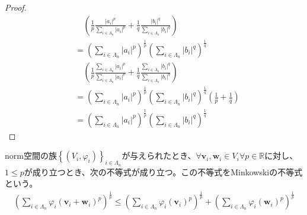 \documentclass[dvipdfmx]{jsarticle}
\begin{document}
\begin{proof}
\begin{align*}
&\quad \left( \frac{1}{p}\frac{\left| a_{i} \right|^{p}}{\sum_{i \in \varLambda_{n}} \left| a_{i} \right|^{p}} + \frac{1}{q}\frac{\left| b_{i} \right|^{q}}{\sum_{i \in \varLambda_{n}} \left| b_{i} \right|^{q}} \right)\\
&= \left( \sum_{i \in \varLambda_{n}} \left| a_{i} \right|^{p} \right)^{\frac{1}{p}}\left( \sum_{i \in \varLambda_{n}} \left| b_{i} \right|^{q} \right)^{\frac{1}{q}}\\
&\quad \left( \frac{1}{p}\frac{\sum_{i \in \varLambda_{n}} \left| a_{i} \right|^{p}}{\sum_{i \in \varLambda_{n}} \left| a_{i} \right|^{p}} + \frac{1}{q}\frac{\sum_{i \in \varLambda_{n}} \left| b_{i} \right|^{q}}{\sum_{i \in \varLambda_{n}} \left| b_{i} \right|^{q}} \right)\\
&= \left( \sum_{i \in \varLambda_{n}} \left| a_{i} \right|^{p} \right)^{\frac{1}{p}}\left( \sum_{i \in \varLambda_{n}} \left| b_{i} \right|^{q} \right)^{\frac{1}{q}}\left( \frac{1}{p} + \frac{1}{q} \right)\\
&= \left( \sum_{i \in \varLambda_{n}} \left| a_{i} \right|^{p} \right)^{\frac{1}{p}}\left( \sum_{i \in \varLambda_{n}} \left| b_{i} \right|^{q} \right)^{\frac{1}{q}}
\end{align*}
\end{proof}
\begin{thm}[Minkowskiの不等式]\label{2.3.1.9}
norm空間の族$\left\{ \left( V_{i},\varphi_{i} \right) \right\}_{i \in \varLambda_{n}}$が与えられたとき、$\forall\mathbf{v}_{i},\mathbf{w}_{i} \in V_{i}\forall p \in \mathbb{R}$に対し、$1 \leq p$が成り立つとき、次の不等式が成り立つ。この不等式をMinkowskiの不等式という。
\begin{align*}
\left( \sum_{i \in \varLambda_{n}} {\varphi_{i}\left( \mathbf{v}_{i} + \mathbf{w}_{i} \right)}^{p} \right)^{\frac{1}{p}} \leq \left( \sum_{i \in \varLambda_{n}} {\varphi_{i}\left( \mathbf{v}_{i} \right)}^{p} \right)^{\frac{1}{p}} + \left( \sum_{i \in \varLambda_{n}} {\varphi_{i}\left( \mathbf{w}_{i} \right)}^{p} \right)^{\frac{1}{p}}
\end{align*}
\end{thm}
\end{document}
